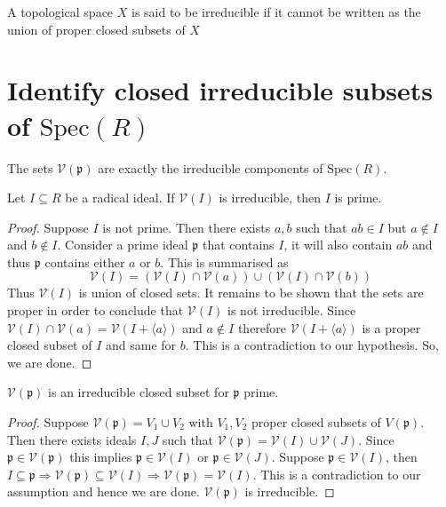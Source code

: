 \documentclass[oneside, 12pt, ]{scrbook}
\newcommand{\V}{\mathcal{V}}
\newcommand{\spec}{\mathrm{Spec}}
\newcommand{\pr}{\mathfrak{p}}
\theoremstyle{theorem}
\begin{document}
\begin{definition}
A topological space $X$ is said to be irreducible if it cannot be written as the union of proper closed subsets of $X$
\end{definition}

\section{Identify closed irreducible subsets of $\spec(R)$}

\begin{proposition}
The sets $\V(\pr)$ are exactly the irreducible components of $\spec(R)$.
\end{proposition}

\begin{lemma}
Let $I \subseteq R$ be a radical ideal. If $\V(I)$ is irreducible, then $I$ is prime.  
\end{lemma}

\begin{proof}
Suppose $I$ is not prime. Then there exists $a,b$ such that $ab \in I$ but $a\not \in I$ and $b \not \in I$. Consider a prime ideal $\pr$ that contains $I$, it will also contain $ab$ and thus $\pr$ contains either $a$ or $b$. This is summarised as $$\V(I) = (\V(I)\cap \V(a)) \cup (\V(I) \cap \V(b))$$ Thus $\V(I)$ is union of closed sets. It remains to be shown that the sets are proper in order to conclude that $\V(I)$ is not irreducible. Since $\V(I) \cap \V(a) = \V(I + \langle a \rangle)$ and $a \not \in I$ therefore $\V(I +\langle a \rangle)$ is a proper closed subset of $I$ and same for $b$. This is a contradiction to our hypothesis. So, we are done. 
\end{proof}

\begin{lemma}
$\V(\pr)$ is an irreducible closed subset for $\pr$ prime.
\end{lemma}

\begin{proof}
Suppose $\V(\pr) = V_{1} \cup V_{2}$ with $V_{1},V_{2}$ proper closed subsets of $V(\pr)$. Then there exists ideals $I,J$ such that $\V(\pr) = \V(I) \cup \V(J)$. Since $\pr \in \V(\pr)$ this implies $\pr \in \V(I)$ or $\pr \in \V(J)$. Suppose $\pr \in \V(I)$, then $I \subseteq \pr \Rightarrow \V(\pr) \subseteq \V(I) \Rightarrow \V(\pr) = \V(I)$. This is a contradiction to our assumption and hence we are done. $\V(\pr)$ is irreducible.
\end{proof}
\end{document}

